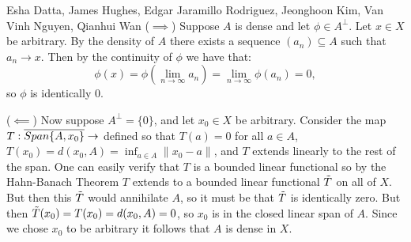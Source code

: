 

\begin{solution}{Esha Datta, James Hughes, Edgar Jaramillo Rodriguez, Jeonghoon Kim, Van Vinh Nguyen, Qianhui Wan}
        ($\implies$) 
        Suppose $A$ is dense and let $\phi\in A^\perp$.
        Let $x\in X$ be arbitrary.
        By the density of $A$ there exists a sequence $(a_n)\subseteq A$ such that $a_n\to x$.
        Then by the continuity of $\phi$ we have that:
        \[ \phi(x) = \phi(\lim_{n\to \infty}a_n ) = \lim_{n\to \infty} \phi(a_n) =0, \]
        so $\phi$ is identically 0.

        ($\impliedby$) 
        Now suppose $A^{\perp}=\{0\}$, and let $x_0\in X$ be arbitrary.
        Consider the map $T: \overline{Span\{A,x_0\}} \to \real$ defined so that $T(a) = 0$ for all $a\in A$, $T(x_0) = d(x_0,A) = \inf_{a\in A}\lVert x_0-a \rVert$, and $T$ extends linearly to the rest of the span.
        One can easily verify that $T$ is a bounded linear functional so by the Hahn-Banach Theorem $T$ extends to a bounded linear functional $\Tilde{T}$ on all of $X$.
        But then this $\Tilde{T}$ would annihilate $A$, so it must be that $\Tilde{T}$ is identically zero.
        But then $\Tilde{T}(x_0) = T(x_0) = d(x_0,A) =0$, so $x_0$ is in the closed linear span of $A$.
        Since we chose $x_0$ to be arbitrary it follows that $A$ is dense in $X$.
\end{solution}


